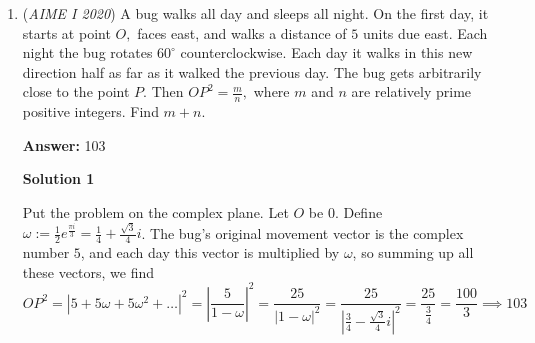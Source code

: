 \begin{enumerate}
Notice that if $k$ men are picked, then $k+1$ women must be picked. Furthermore, $k$ can range from $0$ to $11$. Then, 
 \[N=\sum_{k=0}^{11} \binom{11}{k}\binom{12}{k+1}=\binom{11}{0}\binom{12}{1}+\binom{11}{1}\binom{12}{2}+\dots+\binom{11}{11}\binom{12}{12}\]Since $\binom{n}{k}=\binom{n}{n-k}$, this equals
 \[N=\binom{11}{0}\binom{12}{11}+\binom{11}{1}\binom{12}{10}+\dots+\binom{11}{11}\binom{12}{0}\]According to Vandermonde's Identity,
 \[N=\binom{11+12}{11}=\binom{23}{11}\]
 \[N=\frac{23!}{11!\cdot 12!}=\frac{2^{19}\cdot 3^9\cdot 5^4\cdot 7^3\cdot 11^2\cdot 13\cdot 17\cdot 19\cdot 23}{2^{10}\cdot 3^5\cdot 5^2\cdot 7\cdot 11\times 2^8\cdot 3^4\cdot 5^2\cdot 7\cdot 11}=2\cdot 7\cdot 13\cdot 17\cdot 19\cdot 23\rightarrow \boxed{081}\]~\href{https://artofproblemsolving.com/wiki/index.php/User:Sid2012\#User}{sid2012}

 



\textbf{Solution 7 ( *Rigorous* Recursion)}

Test the cases where there are $0$ men $1$ woman, $1$ man $2$ women, $2$ men $3$ women ... you will get the sequence $1$, $3$, $10$, $35$. Multiply all these numbers by $2$ to get $2$, $6$, $20$, $70$, which is also $\binom{2}{1}$, $\binom{4}{2}$, $\binom{6}{3}$, $\binom{8}{4}$. Thus, continuing this pattern, the case with $11$ men and $12$ women should have $\frac{\binom{24}{12}}{2}$ ways to select the committee.-Kevin2010

 (Solves using both methods - Casework and Vandermonde's Identity)

 


	\item (\textit{AIME I 2020}) A bug walks all day and sleeps all night. On the first day, it starts at point $O,$ faces east, and walks a distance of $5$ units due east. Each night the bug rotates $60^\circ$ counterclockwise. Each day it walks in this new direction half as far as it walked the previous day. The bug gets arbitrarily close to the point $P.$ Then $OP^2=\frac{m}{n},$ where $m$ and $n$ are relatively prime positive integers. Find $m+n.$

 \textbf{Answer: }103



\textbf{Solution 1}

Put the problem on the complex plane. Let $O$ be $0$. Define $\omega := \frac{1}{2}e^{\frac{\pi i}{3}} =\frac{1}{4}+\frac{\sqrt{3}}{4}i$. The bug's original movement vector is the complex number $5$, and each day this vector is multiplied by $\omega$, so summing up all these vectors, we find
 \[OP^2 = \left| 5+5\omega + 5\omega^2 + \dots \right|^2 = \left| \frac{5}{1-\omega} \right|^2 = \frac{25}{|1-\omega|^2} = \frac{25}{|\frac{3}{4}-\frac{\sqrt{3}}{4}i|^2}=\frac{25}{\frac{3}{4}}=\frac{100}{3} \implies \boxed{103}\]


\end{enumerate}
